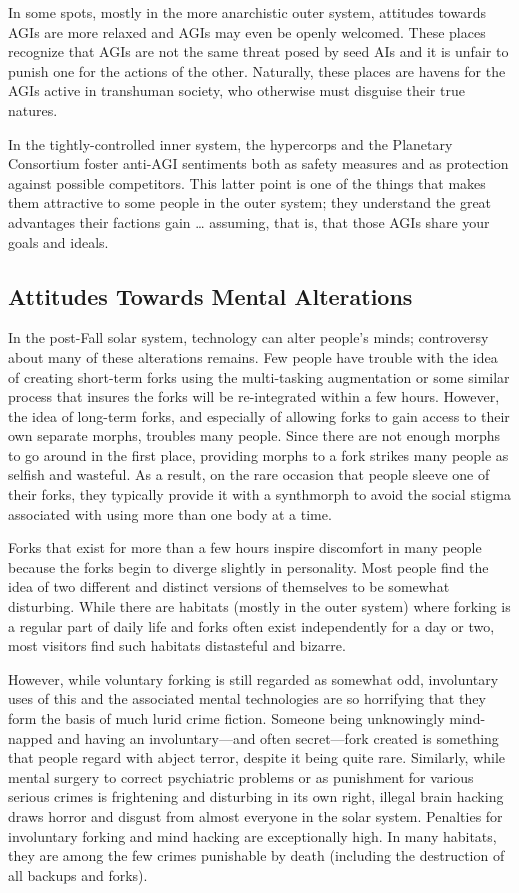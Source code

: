In some spots, mostly in the more anarchistic outer 
system, attitudes towards AGIs are more relaxed and 
AGIs may even be openly welcomed. These places 
recognize that AGIs are not the same threat posed by 
seed AIs and it is unfair to punish one for the actions 
of the other. Naturally, these places are havens for the 
AGIs active in transhuman society, who otherwise 
must disguise their true natures.

In the tightly-controlled inner system, the hypercorps and the Planetary Consortium foster anti-AGI 
sentiments both as safety measures and as protection 
against possible competitors. This latter point is one 
of the things that makes them attractive to some 
people in the outer system; they understand the great 
advantages their factions gain … assuming, that is, 
that those AGIs share your goals and ideals.

\subsection{Attitudes Towards Mental Alterations}

In the post-Fall solar system, technology can alter people's minds; controversy about many of these alterations remains. Few people have trouble with the idea 
of creating short-term forks using the multi-tasking 
augmentation or some similar process that insures 
the forks will be re-integrated within a few hours. 
However, the idea of long-term forks, and especially 
of allowing forks to gain access to their own separate 
morphs, troubles many people. Since there are not 
enough morphs to go around in the first place, providing morphs to a fork strikes many people as selfish 
and wasteful. As a result, on the rare occasion that 
people sleeve one of their forks, they typically provide 
it with a synthmorph to avoid the social stigma associated with using more than one body at a time.

Forks that exist for more than a few hours inspire 
discomfort in many people because the forks begin to 
diverge slightly in personality. Most people find the 
idea of two different and distinct versions of themselves to be somewhat disturbing. While there are 
habitats (mostly in the outer system) where forking 
is a regular part of daily life and forks often exist independently for a day or two, most visitors find such 
habitats distasteful and bizarre.

However, while voluntary forking is still regarded 
as somewhat odd, involuntary uses of this and the 
associated mental technologies are so horrifying that 
they form the basis of much lurid crime fiction. Someone being unknowingly mind-napped and having an 
involuntary—and often secret—fork created is something that people regard with abject terror, despite it 
being quite rare. Similarly, while mental surgery to 
correct psychiatric problems or as punishment for 
various serious crimes is frightening and disturbing 
in its own right, illegal brain hacking draws horror 
and disgust from almost everyone in the solar system. 
Penalties for involuntary forking and mind hacking 
are exceptionally high. In many habitats, they are 
among the few crimes punishable by death (including 
the destruction of all backups and forks). 

